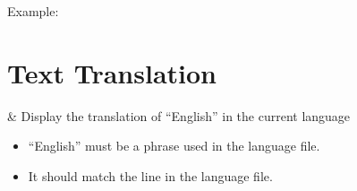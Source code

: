 Example:

\section{Text Translation}
  \begin{tagmap}
    & Display the translation of ``English'' in the current language\\
  \end{tagmap}
  
  \begin{itemize}
    \item ``English'' must be a phrase used in the language file.
    \item It should match the  line in the language file.
  \end{itemize}



